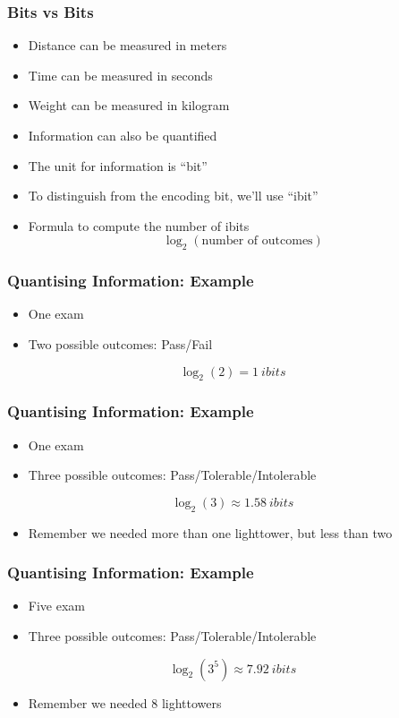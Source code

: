 \begin{frame}
  \frametitle{Bits vs Bits}
  \begin{itemize}
    \item Distance can be measured in meters
    \item Time can be measured in seconds
    \item Weight can be measured in kilogram
    \item Information can also be quantified
    \item The unit for information is ``bit''
    \item To distinguish from the encoding bit, we'll use ``ibit''
    \item Formula to compute the number of ibits
          \[
            \log_2(\textrm{number of outcomes})
          \]
  \end{itemize}
\end{frame}

\begin{frame}
  \frametitle{Quantising Information: Example}
  \begin{itemize}
    \item One exam
    \item Two possible outcomes: Pass/Fail
  \end{itemize}
  \vskip5mm
  \[
    \log_2(2) = \SI{1}{ibits}
  \]
\end{frame}

\begin{frame}
  \frametitle{Quantising Information: Example}
  \begin{itemize}
    \item One exam
    \item Three possible outcomes: Pass/Tolerable/Intolerable
  \end{itemize}
  \vskip5mm
  \[
    \log_2(3) \approx \SI{1.58}{ibits}
  \]
  \vskip5mm
  \begin{itemize}
    \item Remember we needed more than one lighttower, but less than two
  \end{itemize}
\end{frame}

\begin{frame}
  \frametitle{Quantising Information: Example}
  \begin{itemize}
    \item Five exam
    \item Three possible outcomes: Pass/Tolerable/Intolerable
  \end{itemize}
  \vskip5mm
  \[
    \log_2(3^5) \approx \SI{7.92}{ibits}
  \]
  \vskip5mm
  \begin{itemize}
    \item Remember we needed 8 lighttowers
  \end{itemize}
\end{frame}

